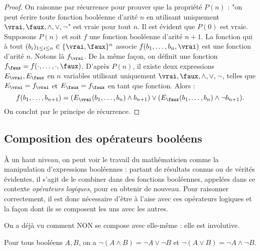 \begin{proof}
    On raisonne par récurrence pour prouver que la propriété $P(n)$ : "on peut écrire toute fonction booléenne d'arité $n$ en utilisant uniquement $\vrai, \faux, \wedge, \vee, \neg$" est vraie pour tout $n$. 
    Il est évident que $P(0)$ est vraie. Supposons $P(n)$ et soit $f$ une fonction booléenne d'arité $n+1$. La fonction qui à tout $(b_i)_{1 \leq i \leq n} \in \{\vrai, \faux\}^n$ associe $f(b_1, \dots, b_n, \vrai)$ est une fonction d'arité $n$. Notons là $f_{\vrai}$. De la même façon, on définit une fonction $f_{\faux} = f(\cdot, \dots, \cdot, \faux)$. D'après $P(n)$, il existe deux expressions $E_{\vrai}, E_{\faux}$ en $n$ variables utilisant uniquement $\vrai, \faux, \wedge, \vee, \neg$, telles que $E_{\vrai} = f_{\vrai}$ et $E_{\faux} = f_{\faux}$ en tant que fonction. Alors :
    $$f(b_1, \dots, b_{n+1}) = (E_{\vrai}(b_1, \dots, b_n) \wedge b_{n+1}) \vee (E_{\faux}(b_1, \dots, b_n) \wedge \neg b_{n+1}).$$
    On conclut par le principe de récurrence.
\end{proof}

\subsection{Composition des opérateurs booléens}

À un haut niveau, on peut voir le travail du mathématicien comme la manipulation d'expressions booléennes : partant de résultats connus ou de vérités évidentes, il s'agit de le combiner dans des fonctions booléennes, appelées dans ce contexte \emph{opérateurs logiques}, pour en obtenir de nouveau. Pour raisonner correctement, il est donc nécessaire d'être à l'aise avec ces opérateurs logiques et la façon dont ils se composent les uns avec les autres.

On a déjà vu comment NON se compose avec elle-même : elle est involutive.

\begin{prop}
    Pour tous booléens $A, B$, on a $\neg (A \wedge B) = \neg A \vee \neg B$ et $\neg(A \vee B) = \neg A \wedge \neg B$.
\end{prop}

